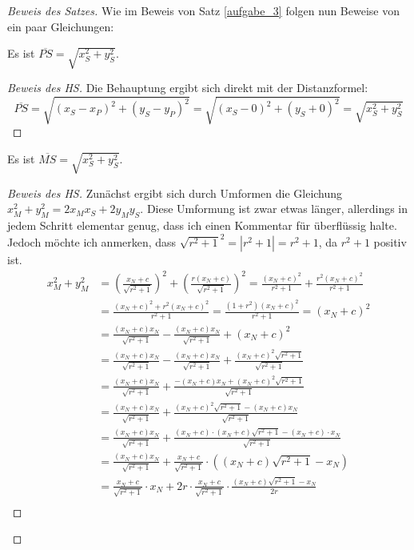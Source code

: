 \begin{proof}[Beweis des Satzes]
    Wie im Beweis von Satz \ref{aufgabe_3} folgen nun Beweise von ein paar Gleichungen:
    \begin{lem}\label{dumm_P}
        Es ist $\overline{PS}=\sqrt{x_S^2+y_S^2}$.
    \end{lem}
    \begin{proof}[Beweis des HS]
        Die Behauptung ergibt sich direkt mit der Distanzformel:
        \[
        \overline{PS}=\sqrt{(x_S-x_P)^2+(y_S-y_P)^2}=\sqrt{(x_S-0)^2+(y_S+0)^2}=\sqrt{x_S^2+y_S^2}    
        \]
    \end{proof}
    \begin{lem}\label{dumm_M}
        Es ist $\overline{MS}=\sqrt{x_S^2+y_S^2}$.
    \end{lem}
    \begin{proof}[Beweis des HS]
        Zunächst ergibt sich durch Umformen die Gleichung $x_M^2+y_M^2=2x_Mx_S+2y_My_S$. Diese Umformung ist 
        zwar etwas länger, allerdings in jedem Schritt elementar genug, dass ich einen Kommentar für überflüssig 
        halte. Jedoch möchte ich anmerken, dass $\sqrt{r^2+1}^2=|r^2+1|=r^2+1$, da $r^2+1$ positiv ist.
        \begin{align*}
            x_M^2+y_M^2&=\left(\frac{x_N+c}{\sqrt{r^2+1}}\right)^2+\left(\frac{r(x_N+c)}{\sqrt{r^2+1}}\right)^2
            =\frac{(x_N+c)^2}{r^2+1}+\frac{r^2(x_N+c)^2}{r^2+1}\\
            &=\frac{(x_N+c)^2+r^2(x_N+c)^2}{r^2+1}=\frac{(1+r^2)(x_N+c)^2}{r^2+1}=(x_N+c)^2\\
            &=\frac{(x_N+c)x_N}{\sqrt{r^2+1}}-\frac{(x_N+c)x_N}{\sqrt{r^2+1}}+(x_N+c)^2\\
            &=\frac{(x_N+c)x_N}{\sqrt{r^2+1}}-\frac{(x_N+c)x_N}{\sqrt{r^2+1}}+\frac{(x_N+c)^2\sqrt{r^2+1}}{\sqrt{r^2+1}}\\
            &=\frac{(x_N+c)x_N}{\sqrt{r^2+1}}+\frac{-(x_N+c)x_N+(x_N+c)^2\sqrt{r^2+1}}{\sqrt{r^2+1}}\\
            &=\frac{(x_N+c)x_N}{\sqrt{r^2+1}}+\frac{(x_N+c)^2\sqrt{r^2+1}-(x_N+c)x_N}{\sqrt{r^2+1}}\\
            &=\frac{(x_N+c)x_N}{\sqrt{r^2+1}}+\frac{(x_N+c)\cdot(x_N+c)\sqrt{r^2+1}-(x_N+c)\cdot x_N}{\sqrt{r^2+1}}\\
            &=\frac{(x_N+c)x_N}{\sqrt{r^2+1}}+\frac{x_N+c}{\sqrt{r^2+1}}\cdot \left((x_N+c)\sqrt{r^2+1}-x_N\right)\\
            &=\frac{x_N+c}{\sqrt{r^2+1}}\cdot x_N+2r\cdot\frac{x_N+c}{\sqrt{r^2+1}}\cdot\frac{(x_N+c)\sqrt{r^2+1}-x_N}{2r}\\

\end{align*}
\end{proof}
\end{proof}

